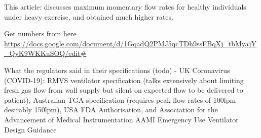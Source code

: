 \documentclass[conference]{article}
\begin{document}
This article: \cite{coyne2006inspiratory}
discusses maximum momentary flow rates for healthy individuals under
heavy exercise, and obtained much higher rates.

Get numbers from here
\url{https://docs.google.com/document/d/1GqadQ2PMJ5qcTDh9ssFBqXj_tbMyajY_QyK9WKKuSOQ/edit#}

What the regulators said in their specifications (todo) - UK Coronavirus (COVID-19): RMVS ventilator specification (talks extensively about limiting fresh gas flow from wall supply but silent on expected flow to be delivered to patient),  Australian TGA specification (requires peak flow rates of 100lpm desirably 150lpm), USA FDA Authorisation, and Association for the Advancement of Medical Instrumentation AAMI Emergency Use Ventilator Design Guidance




\printbibheading

\printbibliography
\end{document}
